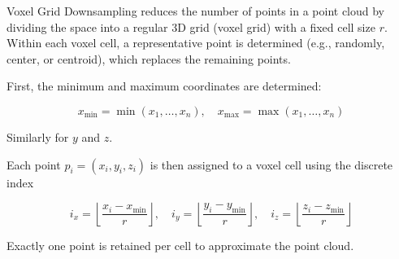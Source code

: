 \begin{English}
    Voxel Grid Downsampling reduces the number of points in a point cloud by dividing the space into a regular 3D grid (voxel grid) with a fixed cell size $r$. Within each voxel cell, a representative point is determined (e.g., randomly, center, or centroid), which replaces the remaining points.

    First, the minimum and maximum coordinates are determined:

    \[
    x_{\min} = \min(x_1, \dots, x_n), \quad x_{\max} = \max(x_1, \dots, x_n)
    \]

    Similarly for $y$ and $z$.

    Each point $p_i = (x_i, y_i, z_i)$ is then assigned to a voxel cell using the discrete index

    \[
    i_x = \left\lfloor \frac{x_i - x_{\min}}{r} \right\rfloor, \quad
    i_y = \left\lfloor \frac{y_i - y_{\min}}{r} \right\rfloor, \quad
    i_z = \left\lfloor \frac{z_i - z_{\min}}{r} \right\rfloor
    \]

    Exactly one point is retained per cell to approximate the point cloud. \cite{liu3DPointCloud2021}
\end{English}

